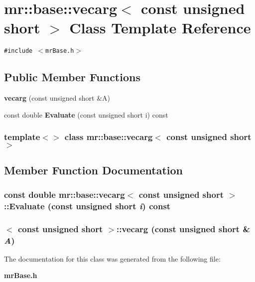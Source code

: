 \section{mr::base::vecarg$<$ const unsigned short $>$ Class Template Reference}
\label{classmr_1_1base_1_1vecarg_3_01const_01unsigned_01short_01_4}
{\tt \#include $<$mr\-Base.h$>$}

\subsection*{Public Member Functions}
\begin{CompactItemize}
\item 
{\bf vecarg} (const unsigned short \&A)
\item 
const double {\bf Evaluate} (const unsigned short i) const 
\end{CompactItemize}
\subsubsection*{template$<$$>$ class mr::base::vecarg$<$ const unsigned short $>$}



\subsection{Member Function Documentation}
\subsubsection{\setlength{\rightskip}{0pt plus 5cm}const double {\bf mr::base::vecarg}$<$ const unsigned short $>$::Evaluate (const unsigned short {\em i}) const\hspace{0.3cm}{\tt  [inline]}}\label{classmr_1_1base_1_1vecarg_3_01const_01unsigned_01short_01_4_a1}


\subsubsection{$<$ const unsigned short $>$::{\bf vecarg} (const unsigned short \& {\em A})\hspace{0.3cm}{\tt  [inline]}}\label{classmr_1_1base_1_1vecarg_3_01const_01unsigned_01short_01_4_a0}




The documentation for this class was generated from the following file:\begin{CompactItemize}
\item 
{\bf mr\-Base.h}\end{CompactItemize}
